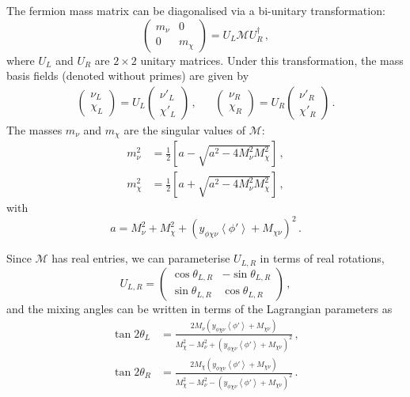 \documentclass[aps, prd, reprint, nofootinbib, amsmath, amssymb, floatfix]{revtex4-2}
\newcommand{\vev}[1]{\left< #1 \right>}      %
\begin{document}
The fermion mass matrix can be diagonalised via a bi-unitary transformation:
%
\begin{equation}
    \begin{pmatrix}
        m_\nu & 0 \\
        0 & m_\chi
    \end{pmatrix}
    =
    U_L \mathcal{M} U_R^\dag \,,
\end{equation}
%
where $U_L$ and $U_R$ are $2\times 2$ unitary matrices. Under this transformation, the mass basis fields (denoted without primes) are given by
%
\begin{align}
    \begin{pmatrix}
        \nu_{L} \\ \chi_{L}
    \end{pmatrix}
    = U_{L} \begin{pmatrix}
        \nu'_{L} \\ \chi'_{L}
    \end{pmatrix} \,,
    &&
    \begin{pmatrix}
        \nu_{R} \\ \chi_{R}
    \end{pmatrix}
    = U_{R} \begin{pmatrix}
        \nu'_{R} \\ \chi'_{R}
    \end{pmatrix} \,.
\end{align}
%
The masses $m_\nu$ and $m_\chi$ are the singular values of $\mathcal{M}$:
%
\begin{align}
    m_\nu^2 & = \frac{1}{2}\left[a - \sqrt{a^2 - 4M_\nu^2M_\chi^2}\right] \,, \\
    m_\chi^2 & = \frac{1}{2}\left[a + \sqrt{a^2 - 4M_\nu^2M_\chi^2}\right] \,,
\end{align}
%
with
%
\begin{equation}
    a = M_\nu^2 + M_\chi^2 + (y_{\phi\chi\nu}\vev{\phi'}+M_{\chi\nu})^2 \,.
\end{equation}

Since $\mathcal{M}$ has real entries, we can parameterise $U_{L,R}$ in terms of real rotations,
%
\begin{equation}
    U_{L,R} = \begin{pmatrix}
        \cos\theta_{L,R} & -\sin\theta_{L,R} \\
        \sin\theta_{L,R} & \cos\theta_{L,R}
    \end{pmatrix} \,,
\end{equation}
%
and the mixing angles can be written in terms of the Lagrangian parameters as
%
\begin{align}
    \tan2\theta_L &=\frac{2 M_\nu (y_{\phi\chi\nu} \vev{\phi'}+M_{\chi\nu})}{M_\chi^2 - M_\nu^2 + (y_{\phi\chi\nu}\vev{\phi'}+M_{\chi\nu})^2} \,, \\
    \tan2\theta_R &= \frac{2 M_\chi (y_{\phi\chi\nu} \vev{\phi'}+M_{\chi\nu})}{M_\chi^2 - M_\nu^2 - (y_{\phi\chi\nu}\vev{\phi'}+M_{\chi\nu})^2} \,.
\end{align}
\end{document}
